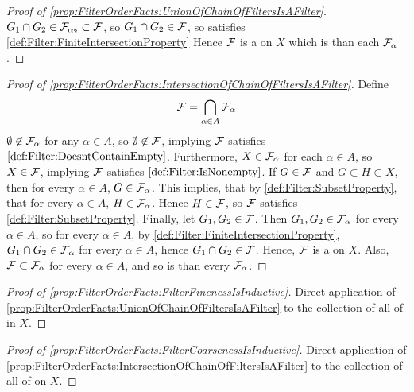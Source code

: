 \begin{prop}
\begin{proof}[Proof of \ref{prop:FilterOrderFacts:UnionOfChainOfFiltersIsAFilter}]
        $G_1 \cap G_2 \in \mathcal{F}_{\alpha_2} \subset \mathcal{F}$, so $G_1 \cap G_2 \in \mathcal{F}$, so 
        \scF satisfies \ref{def:Filter:FiniteIntersectionProperty}
        Hence $\mathcal{F}$ is a \Filter on $X$ which is \FinerFilter
        than each $\mathcal{F}_\alpha$. 
    \end{proof}
    \begin{proof}[Proof of \ref{prop:FilterOrderFacts:IntersectionOfChainOfFiltersIsAFilter}]
        Define 
        \begin{equation*}
            \mathcal{F} = \bigcap\limits_{\alpha \in A} \mathcal{F}_\alpha
        \end{equation*}
        $\emptyset \not \in \mathcal{F}_\alpha$ for any $\alpha \in A$, so $\emptyset \not \in \mathcal{F}$, 
        implying $\mathcal{F}$ satisfies $\ref{def:Filter:DoesntContainEmpty}$. 
        Furthermore, $X \in \mathcal{F}_\alpha$ for each $\alpha \in A$, so $X \in \mathcal{F}$, implying
        $\mathcal{F}$ satisfies $\ref{def:Filter:IsNonempty}$. 
        If $G \in \mathcal{F}$ and $G \subset H\subset X$, then for every $\alpha \in A$, 
        $G \in \mathcal{F}_\alpha$.
        This implies, that by \ref{def:Filter:SubsetProperty}, 
        that for every $\alpha \in A$, $H \in \mathcal{F}_\alpha$. 
        Hence $H \in \mathcal{F}$, so $\mathcal{F}$ satisfies \ref{def:Filter:SubsetProperty}. 
        Finally, let $G_1,G_2 \in \mathcal{F}$. Then $G_1,G_2 \in \mathcal{F}_\alpha$ for every $\alpha \in A$,
        so for every $\alpha \in A$, by \ref{def:Filter:FiniteIntersectionProperty}, 
        $G_1 \cap G_2 \in \mathcal{F}_\alpha$ for every $\alpha \in A$, 
        hence $G_1 \cap G_2 \in \mathcal{F}$. 
        Hence, $\mathcal{F}$ is a \Filter on $X$. 
        Also, $\mathcal{F} \subset \mathcal{F}_\alpha$ for every $\alpha \in A$, and so is 
        \CoarserFilter than every $\mathcal{F}_\alpha$. 
    \end{proof}
    \begin{proof}[Proof of \ref{prop:FilterOrderFacts:FilterFinenessIsInductive}]
        Direct application of  
        \ref{prop:FilterOrderFacts:UnionOfChainOfFiltersIsAFilter}
        to the collection of all \Chains 
        of \Filters in $X$. 
    \end{proof}
    \begin{proof}[Proof of \ref{prop:FilterOrderFacts:FilterCoarsenessIsInductive}]
        Direct application of 
        \ref{prop:FilterOrderFacts:IntersectionOfChainOfFiltersIsAFilter}
        to the collection of all \Chains
        of \Filters on $X$. 
    \end{proof}
\end{prop}

